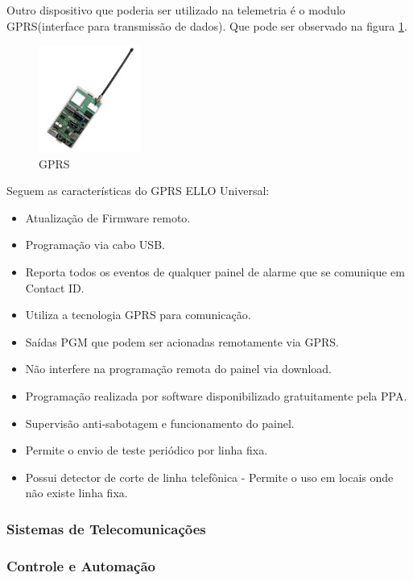 	Outro dispositivo que poderia ser utilizado na telemetria é o modulo GPRS(interface para transmissão de dados). Que pode ser observado na figura \ref{img:GPRS}.

	\begin{figure}[H]
		\centering
		\includegraphics[width=0.3\textwidth]{figuras/GPRS}
		\caption{GPRS}
		\label{img:GPRS}
	\end{figure}

	Seguem as características do GPRS ELLO Universal:

	\begin{itemize}
		\item Atualização de Firmware remoto. 
		\item Programação via cabo USB.
		\item Reporta todos os eventos de qualquer painel de alarme que se comunique em Contact ID. 
		\item Utiliza a tecnologia GPRS para comunicação. 
		\item Saídas PGM que podem ser acionadas remotamente via GPRS.
		\item Não interfere na programação remota do painel via download.
		\item Programação realizada por software disponibilizado gratuitamente pela PPA.
		\item Supervisão anti-sabotagem e funcionamento do painel.
		\item Permite o envio de teste periódico por linha fixa. 
		\item Possui detector de corte de linha telefônica - Permite o uso em locais onde não existe linha fixa. 
	\end{itemize}

\subsubsection{Sistemas de Telecomunicações}

\subsubsection{Controle e Automação}

